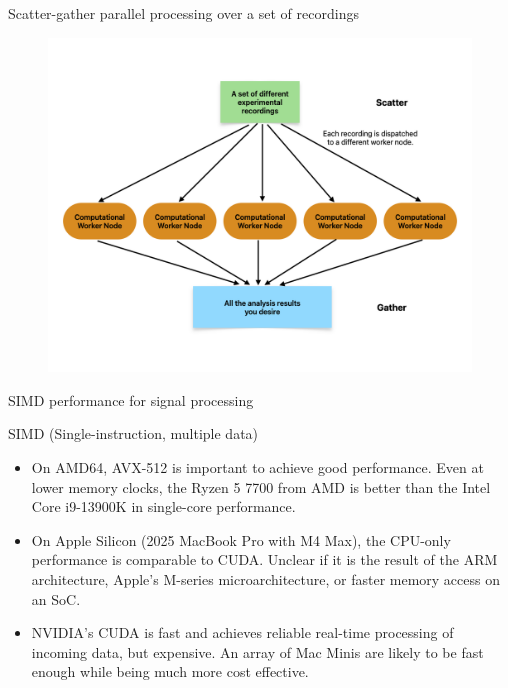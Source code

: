 \documentclass{beamer}
\begin{document}
\begin{frame}{Scatter-gather parallel processing over a set of recordings}
    \begin{figure}
        \includegraphics[width=\linewidth]{assets/scatter-gather-files.png}
    \end{figure}
\end{frame}

\begin{frame}{SIMD performance for signal processing}
    \begin{block}{SIMD (Single-instruction, multiple data)}
        \begin{itemize}
            \item On AMD64, AVX-512 is important to achieve good performance. Even at lower memory clocks, the Ryzen 5 7700 from AMD is better than the Intel Core i9-13900K in single-core performance.\pause
            \item On Apple Silicon (2025 MacBook Pro with M4 Max), the CPU-only performance is comparable to CUDA. Unclear if it is the result of the ARM architecture, Apple's M-series microarchitecture, or faster memory access on an SoC.\pause
            \item NVIDIA's CUDA is fast and achieves reliable real-time processing of incoming data, but expensive. An array of Mac Minis are likely to be fast enough while being much more cost effective.
        \end{itemize}
    \end{block}
\end{frame}
\end{document}
